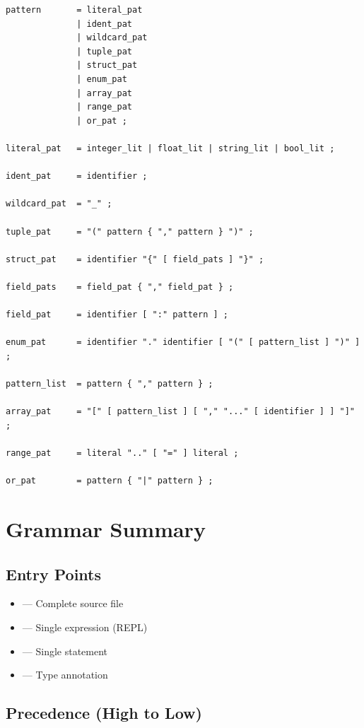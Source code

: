 \begin{lstlisting}[language=EBNF]
pattern       = literal_pat
              | ident_pat
              | wildcard_pat
              | tuple_pat
              | struct_pat
              | enum_pat
              | array_pat
              | range_pat
              | or_pat ;

literal_pat   = integer_lit | float_lit | string_lit | bool_lit ;

ident_pat     = identifier ;

wildcard_pat  = "_" ;

tuple_pat     = "(" pattern { "," pattern } ")" ;

struct_pat    = identifier "{" [ field_pats ] "}" ;

field_pats    = field_pat { "," field_pat } ;

field_pat     = identifier [ ":" pattern ] ;

enum_pat      = identifier "." identifier [ "(" [ pattern_list ] ")" ] ;

pattern_list  = pattern { "," pattern } ;

array_pat     = "[" [ pattern_list ] [ "," "..." [ identifier ] ] "]" ;

range_pat     = literal ".." [ "=" ] literal ;

or_pat        = pattern { "|" pattern } ;
\end{lstlisting}

\section{Grammar Summary}

\subsection{Entry Points}

\begin{itemize}
    \item {} --- Complete source file
    \item {} --- Single expression (REPL)
    \item {} --- Single statement
    \item {} --- Type annotation
\end{itemize}

\subsection{Precedence (High to Low)}

